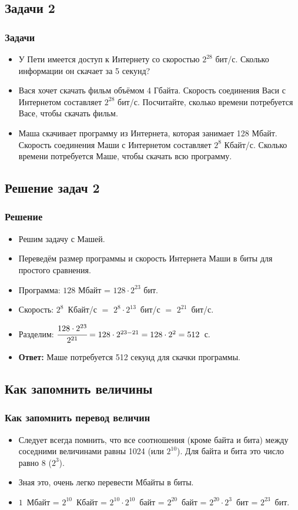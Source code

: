 \documentclass[compress,red]{beamer}
\begin{document}
\subsection{Задачи 2}
\begin{frame}[fragile]
  \frametitle{Задачи}
  \begin{itemize}
    \item У Пети имеется доступ к Интернету со скоростью $2^{28}$ бит/с. Сколько информации он скачает за 5 секунд?
    \item Вася хочет скачать фильм объёмом 4 Гбайта. Скорость соединения Васи с Интернетом составляет $2^{28}$ бит/с. Посчитайте, сколько времени потребуется Васе, чтобы скачать фильм.
    \item Маша скачивает программу из Интернета, которая занимает 128 Мбайт. Скорость соединения Маши с Интернетом составляет $2^8$ Кбайт/с. Сколько времени потребуется Маше, чтобы скачать всю программу.
  \end{itemize}
\end{frame}

\subsection{Решение задач 2}
\begin{frame}[fragile]
  \frametitle{Решение}
  \begin{itemize}
    \item Решим задачу с Машей.
    \item Переведём размер программы и скорость Интернета Маши в биты для простого сравнения.
    \item Программа: $128$ Мбайт = $128\cdot 2^{23}$ бит.
    \item Скорость: $2^8$~Кбайт/с $=$ $2^8\cdot 2^{13}$~бит/с $=$ $2^{21}$~бит/с.
    \item Разделим: $\cfrac{128\cdot 2^{23}}{2^{21}} = 128\cdot 2^{23-21} = 128\cdot 2^2 = 512$~с.
    \item \textbf{Ответ:} Маше потребуется 512 секунд для скачки программы.
  \end{itemize}
\end{frame}

\subsection{Как запомнить величины}
\begin{frame}[fragile]
  \frametitle{Как запомнить перевод величин}
  \begin{itemize}
    \item Следует всегда помнить, что все соотношения (кроме байта и бита) между соседними величинами равны 1024 (или $2^{10}$). Для байта и бита это число равно 8 ($2^3$).
    \item Зная это, очень легко перевести Мбайты в биты.
    \item $1$~Мбайт = $2^{10}$~Кбайт = $2^{10}\cdot 2^{10}$~байт = $2^{20}$~байт = $2^{20}\cdot 2^3$~бит = $2^{23}$~бит.
  \end{itemize}
\end{frame}
\end{document}
